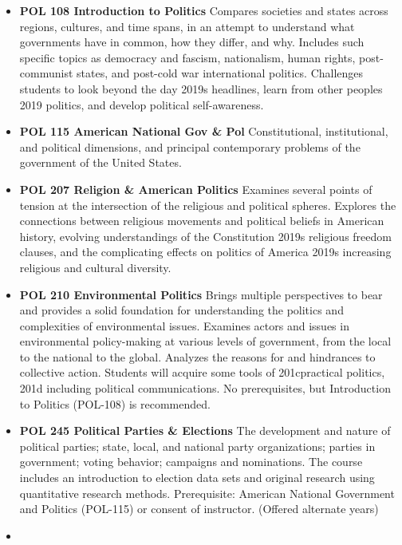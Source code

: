 \documentclass[
  letterpaper,
]{scrbook}
\providecommand{\tightlist}{%
  \setlength{\itemsep}{0pt}\setlength{\parskip}{0pt}}
\begin{document}
\begin{itemize}
\tightlist
\item
  \textbf{POL 108 Introduction to Politics} Compares societies and
  states across regions, cultures, and time spans, in an attempt to
  understand what governments have in common, how they differ, and why.
  Includes such specific topics as democracy and fascism, nationalism,
  human rights, post-communist states, and post-cold war international
  politics. Challenges students to look beyond the day 2019s headlines,
  learn from other peoples 2019 politics, and develop political
  self-awareness.\\
\item
  \textbf{POL 115 American National Gov \& Pol} Constitutional,
  institutional, and political dimensions, and principal contemporary
  problems of the government of the United States.
\item
  \textbf{POL 207 Religion \& American Politics} Examines several points
  of tension at the intersection of the religious and political spheres.
  Explores the connections between religious movements and political
  beliefs in American history, evolving understandings of the
  Constitution 2019s religious freedom clauses, and the complicating
  effects on politics of America 2019s increasing religious and cultural
  diversity.\\
\item
  \textbf{POL 210 Environmental Politics} Brings multiple perspectives
  to bear and provides a solid foundation for understanding the politics
  and complexities of environmental issues. Examines actors and issues
  in environmental policy-making at various levels of government, from
  the local to the national to the global. Analyzes the reasons for and
  hindrances to collective action. Students will acquire some tools of
  201cpractical politics, 201d including political communications. No
  prerequisites, but Introduction to Politics (POL-108) is recommended.
\item
  \textbf{POL 245 Political Parties \& Elections} The development and
  nature of political parties; state, local, and national party
  organizations; parties in government; voting behavior; campaigns and
  nominations. The course includes an introduction to election data sets
  and original research using quantitative research methods.
  Prerequisite: American National Government and Politics (POL-115) or
  consent of instructor. (Offered alternate years)\\
\item

\end{itemize}
\end{document}
